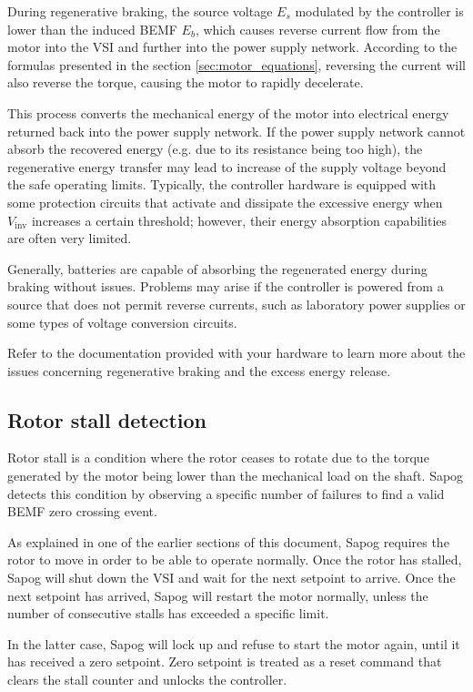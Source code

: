 \documentclass{zubaxdoc}
\begin{document}
During regenerative braking, the source voltage $E_s$ modulated by the controller is lower than the
induced BEMF $E_b$, which causes reverse current flow from the motor into the VSI
and further into the power supply network.
According to the formulas presented in the section \ref{sec:motor_equations},
reversing the current will also reverse the torque, causing the motor to rapidly decelerate.

This process converts the mechanical energy of the motor into electrical energy returned back into the
power supply network.
If the power supply network cannot absorb the recovered energy (e.g. due to its resistance being too high),
the regenerative energy transfer may lead to increase of the supply voltage beyond the safe operating limits.
Typically, the controller hardware is equipped with some protection circuits that activate and dissipate the
excessive energy when $V_\text{inv}$ increases a certain threshold;
however, their energy absorption capabilities are often very  limited.

Generally, batteries are capable of absorbing the regenerated energy during braking without issues.
Problems may arise if the controller is powered from a source that does not permit reverse currents,
such as laboratory power supplies or some types of voltage conversion circuits.

Refer to the documentation provided with your hardware to learn more about the issues
concerning regenerative braking and the excess energy release.

\subsection{Rotor stall detection}\label{sec:stall_detection}

Rotor stall is a condition where the rotor ceases to rotate due to the torque generated by the motor
being lower than the mechanical load on the shaft.
Sapog detects this condition by observing a specific number of failures to find
a valid BEMF zero crossing event.

As explained in one of the earlier sections of this document,
Sapog requires the rotor to move in order to be able to operate normally.
Once the rotor has stalled, Sapog will shut down the VSI and wait for the next setpoint to arrive.
Once the next setpoint has arrived, Sapog will restart the motor normally,
unless the number of consecutive stalls has exceeded a specific limit.

In the latter case, Sapog will lock up and refuse to start the motor again,
until it has received a zero setpoint.
Zero setpoint is treated as a reset command that clears the stall counter and unlocks the controller.
\end{document}
